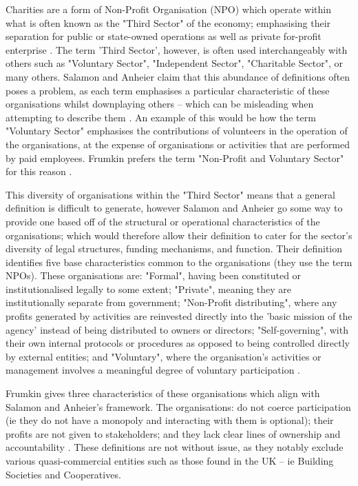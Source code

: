 Charities are a form of Non-Profit Organisation (NPO) which operate within what is often known as the "Third Sector" of the economy; emphasising their separation for public or state-owned operations as well as private for-profit enterprise \cite{salamon_search_1992-1}. The term 'Third Sector', however, is often used interchangeably with others such as "Voluntary Sector", "Independent Sector", "Charitable Sector", or many others. Salamon and Anheier claim that this abundance of definitions often poses a problem, as each term emphasises a particular characteristic of these organisations whilst downplaying others -- which can be misleading when attempting to describe them \cite{salamon_search_1992-1}. An example of this would be how the term "Voluntary Sector" emphasises the contributions of volunteers in the operation of the organisations, at the expense of organisations or activities that are performed by paid employees. Frumkin prefers the term "Non-Profit and Voluntary Sector" for this reason \cite{frumkin_being_2009}.

This diversity of organisations within the "Third Sector" means that a general definition is difficult to generate, however Salamon and Anheier go some way to provide one based off of the structural or operational characteristics of the organisations; which would therefore allow their definition to cater for the sector's diversity of legal structures, funding mechanisms, and function. Their definition identifies five base characteristics common to the organisations (they use the term NPOs). These organisations are: "Formal", having been constituted or institutionalised legally to some extent; "Private", meaning they are institutionally separate from government; "Non-Profit distributing", where any profits generated by activities are reinvested directly into the 'basic mission of the agency' instead of being distributed to owners or directors; "Self-governing", with their own internal protocols or procedures as opposed to being controlled directly by external entities; and "Voluntary", where the organisation's activities or management involves a meaningful degree of voluntary participation \cite{salamon_search_1992-1}.

Frumkin gives three characteristics of these organisations which align with Salamon and Anheier's framework. The organisations: do not coerce participation (ie they do not have a monopoly and interacting with them is optional); their profits are not given to stakeholders; and they lack clear lines of ownership and accountability \cite{frumkin_being_2009}. These definitions are not without issue, as they notably exclude various quasi-commercial entities such as those found in the UK -- ie Building Societies and Cooperatives.

